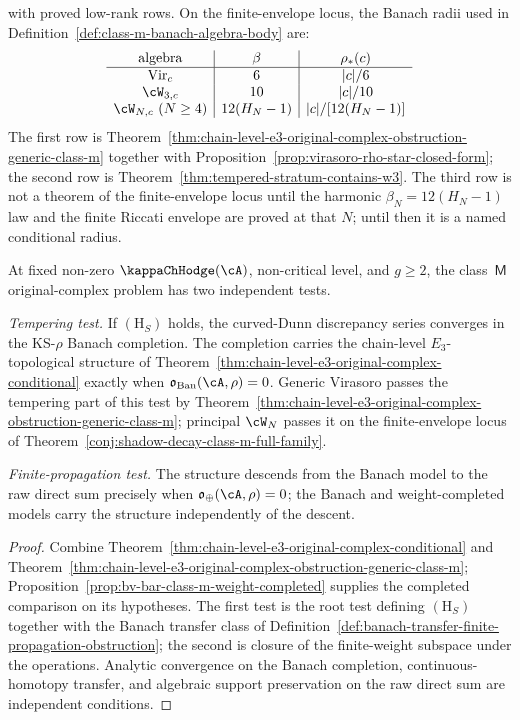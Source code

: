 \begin{corollary}
\label{cor:class-m-banach-radii}
\ClaimStatusConditional{} with proved low-rank rows.
On the finite-envelope locus, the Banach radii used in
Definition~\ref{def:class-m-banach-algebra-body} are:
\[
\begin{array}{c|c|c}
\text{algebra} & \beta & \rho_*(c) \\
\hline
\mathrm{Vir}_c & 6 & |c|/6 \\
\cW_{3,c} & 10 & |c|/10 \\
\cW_{N,c}\ (N\ge4) & 12(H_N-1) & |c|/[12(H_N-1)]
\end{array}
\]
The first row is Theorem~\ref{thm:chain-level-e3-original-complex-obstruction-generic-class-m}
together with Proposition~\ref{prop:virasoro-rho-star-closed-form};
the second row is Theorem~\ref{thm:tempered-stratum-contains-w3}.  The
third row is not a theorem of the finite-envelope locus until the
harmonic \(\beta_N=12(H_N-1)\) law and the finite Riccati envelope are
proved at that \(N\); until then it is a named conditional radius.
\end{corollary}

\begin{corollary}
\label{cor:class-m-original-complex-dichotomy}
At fixed non-zero $\kappaChHodge(\cA)$, non-critical level, and $g\ge 2$,
the class~$\mathsf{M}$ original-complex problem has two independent
tests.

\emph{Tempering test.} If $(\mathrm{H}_S)$ holds, the curved-Dunn
discrepancy series converges in the KS-$\rho$ Banach completion. The
completion carries the chain-level $E_3$-topological structure of
Theorem~\ref{thm:chain-level-e3-original-complex-conditional} exactly
when $\mathfrak{o}_{\mathrm{Ban}}(\cA,\rho)=0$. Generic Virasoro passes
the tempering part of this test by
Theorem~\ref{thm:chain-level-e3-original-complex-obstruction-generic-class-m};
principal $\cW_N$ passes it on the finite-envelope locus of
Theorem~\ref{conj:shadow-decay-class-m-full-family}.

\emph{Finite-propagation test.} The structure descends from the
Banach model to the raw direct sum precisely when
$\mathfrak{o}_{\oplus}(\cA,\rho)=0$; the Banach and weight-completed
models carry the structure independently of the descent.
\end{corollary}

\begin{proof}
Combine
Theorem~\ref{thm:chain-level-e3-original-complex-conditional} and
Theorem~\ref{thm:chain-level-e3-original-complex-obstruction-generic-class-m};
Proposition~\ref{prop:bv-bar-class-m-weight-completed} supplies the
completed comparison on its hypotheses. The first test is the root
test defining $(\mathrm{H}_S)$ together with the Banach transfer
class of
Definition~\ref{def:banach-transfer-finite-propagation-obstruction};
the second is closure of the finite-weight subspace under the
operations. Analytic convergence on the Banach completion,
continuous-homotopy transfer, and algebraic support preservation on
the raw direct sum are independent conditions.
\end{proof}

